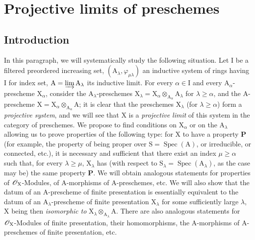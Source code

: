 \section{Projective limits of preschemes}
\label{section:IV.8}

\subsection{Introduction}
\label{subsection:IV.8.1}


\begin{env}[8.1.1]
\label{IV.8.1.1}
In this paragraph, we will systematically study the following situation.
Let $\mathrm{I}$ be a filtered preordered increasing set, $(\mathrm{A}_\lambda,\varphi_{\mu\lambda})$ an inductive system of rings having $\mathrm{I}$ for index set, $\mathrm{A}=\varinjlim\mathrm{A}_\lambda$ its inductive limit.
For every $\alpha\in\mathrm{I}$ and every $\mathrm{A}_\alpha$-prescheme $\mathrm{X}_\alpha$, consider the $\mathrm{A}_\lambda$-preschemes $\mathrm{X}_\lambda=\mathrm{X}_\alpha\otimes_{\mathrm{A}_\alpha}\mathrm{A}_\lambda$ for $\lambda\geqslant\alpha$, and the $\mathrm{A}$-prescheme $\mathrm{X}=\mathrm{X}_\alpha\otimes_{\mathrm{A}_\alpha}\mathrm{A}$; it is clear that the preschemes $\mathrm{X}_\lambda$ (for $\lambda\geqslant\alpha$) form a \emph{projective system}, and we will see  that $\mathrm{X}$ is a \emph{projective limit} of this system in the category of preschemes.
We propose to find conditions on $\mathrm{X}_\alpha$ or on the $\mathrm{A}_\lambda$ allowing us to prove properties of the following type:
for $\mathrm{X}$ to have a property $\mathbf{P}$ (for example, the property of being proper over $\mathrm{S}=\operatorname{Spec}(\mathrm{A})$, or irreducible, or connected, etc.), it is necessary and sufficient that there exist an index $\mu\geqslant\alpha$ such that, for every $\lambda\geqslant\mu$, $\mathrm{X}_\lambda$ has (with respect to $\mathrm{S}_\lambda=\operatorname{Spec}(\mathrm{A}_\lambda)$, as the case may be) the same property $\mathbf{P}$.
We will obtain analogous statements for properties of $\mathscr{O}_\mathrm{X}$-Modules, of $\mathrm{A}$-morphisms of $\mathrm{A}$-preschemes, etc.
We will also show  that the datum of an $\mathrm{A}$-prescheme of finite presentation  is essentially equivalent to the datum of an $\mathrm{A}_\lambda$-prescheme of finite presentation $\mathrm{X}_\lambda$ for some sufficiently large $\lambda$, $\mathrm{X}$ being then \emph{isomorphic to} $\mathrm{X}_\lambda\otimes_{\mathrm{A}_\lambda}\mathrm{A}$.
There are also analogous statements for $\mathscr{O}_\mathrm{X}$-Modules of finite presentation, their homomorphisms, the $\mathrm{A}$-morphisms of $\mathrm{A}$-preschemes of finite presentation, etc.
\end{env}

